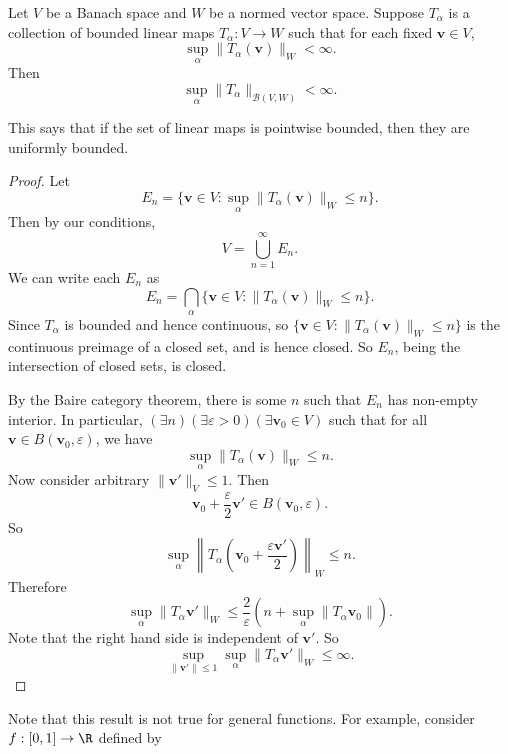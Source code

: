 \documentclass[a4paper]{article}
\begin{document}
\begin{thm}
  Let $V$ be a Banach space and $W$ be a normed vector space. Suppose $T_\alpha$ is a collection of bounded linear maps $T_\alpha: V\to W$ such that for each fixed $\mathbf{v} \in V$,
  \[
    \sup_\alpha \|T_\alpha (\mathbf{v})\|_W < \infty.
  \]
  Then
  \[
    \sup_\alpha \|T_\alpha\|_{\mathcal{B}(V, W)} < \infty.
  \]
\end{thm}
This says that if the set of linear maps is pointwise bounded, then they are uniformly bounded.
\begin{proof}
  Let
  \[
    E_n = \{\mathbf{v} \in V: \sup_\alpha \|T_\alpha(\mathbf{v})\|_W \leq n\}.
  \]
  Then by our conditions,
  \[
    V = \bigcup_{n = 1}^\infty E_n.
  \]
  We can write each $E_n$ as
  \[
    E_n = \bigcap_\alpha \{\mathbf{v} \in V: \|T_\alpha (\mathbf{v})\|_W \leq n\}.
  \]
  Since $T_\alpha$ is bounded and hence continuous, so $\{\mathbf{v} \in V: \|T_\alpha (\mathbf{v})\|_W\leq n\}$ is the continuous preimage of a closed set, and is hence closed. So $E_n$, being the intersection of closed sets, is closed.

  By the Baire category theorem, there is some $n$ such that $E_n$ has non-empty interior. In particular, $(\exists n) (\exists \varepsilon > 0)(\exists \mathbf{v}_0 \in V)$ such that for all $\mathbf{v}\in B(\mathbf{v}_0, \varepsilon)$, we have
  \[
    \sup_{\alpha} \|T_\alpha(\mathbf{v})\|_W \leq n.
  \]
  Now consider arbitrary $\|\mathbf{v}'\|_V \leq 1$. Then
  \[
    \mathbf{v}_0 + \frac{\varepsilon}{2} \mathbf{v}' \in B(\mathbf{v}_0, \varepsilon).
  \]
  So
  \[
    \sup_\alpha \left\|T_\alpha\left(\mathbf{v}_0 + \frac{\varepsilon \mathbf{v}'}{2}\right)\right\|_W \leq n.
  \]
  Therefore
  \[
    \sup_\alpha \|T_\alpha \mathbf{v}'\|_W \leq \frac{2}{\varepsilon} \left(n + \sup_\alpha \|T_\alpha \mathbf{v}_0\|\right).
  \]
  Note that the right hand side is independent of $\mathbf{v}'$. So
  \[
    \sup_{\|\mathbf{v}'\| \leq 1}\sup_\alpha \|T_\alpha \mathbf{v}'\|_W \leq \infty.
  \]
\end{proof}
Note that this result is not true for general functions. For example, consider $f: [0, 1] \to \R$ defined by
\begin{center}
\end{center}
\end{document}
